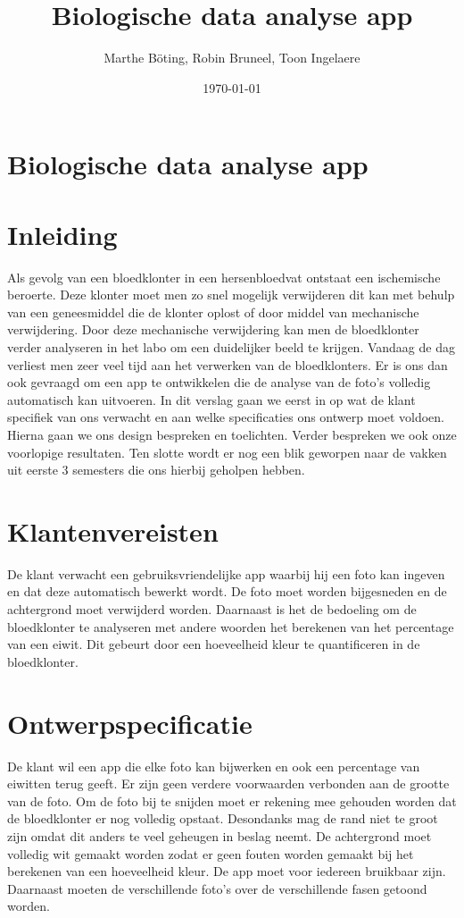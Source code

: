 \documentclass{kulakarticle}
\title{Biologische data analyse app}
\author{Marthe Böting, Robin Bruneel, Toon Ingelaere}
\date{\today}
\begin{document}
	\maketitle
	\section*{Biologische data analyse app}
	\section{Inleiding}
	Als gevolg van een bloedklonter in een hersenbloedvat ontstaat een ischemische beroerte. Deze klonter moet men zo snel mogelijk verwijderen dit kan met behulp van een geneesmiddel die de klonter oplost of door middel van mechanische verwijdering. Door deze mechanische verwijdering kan men de bloedklonter verder analyseren in het labo om een duidelijker beeld te krijgen.
	\newline
	Vandaag de dag verliest men zeer veel tijd aan het verwerken van de bloedklonters. Er is ons dan ook gevraagd om een app te ontwikkelen die de analyse van de foto’s volledig automatisch kan uitvoeren.
	\newline
	In dit verslag gaan we eerst in op wat de klant specifiek van ons verwacht en aan welke specificaties ons ontwerp moet voldoen. Hierna gaan we ons design bespreken en toelichten. Verder bespreken we ook onze voorlopige resultaten. Ten slotte wordt er nog een blik geworpen naar de vakken uit eerste 3 semesters die ons hierbij geholpen hebben.
	
	\section{Klantenvereisten}
	De klant verwacht een gebruiksvriendelijke app waarbij hij een foto kan ingeven en dat deze automatisch bewerkt wordt. De foto moet  worden bijgesneden en de achtergrond moet verwijderd worden. Daarnaast is het de bedoeling om de bloedklonter te analyseren met andere woorden het berekenen van het percentage van een eiwit. Dit gebeurt door een hoeveelheid kleur te quantificeren in de bloedklonter. 

	\section{Ontwerpspecificatie}
	De klant wil een app die elke foto kan bijwerken en ook een percentage van eiwitten terug geeft. Er zijn geen verdere voorwaarden verbonden aan de grootte van de foto. Om de foto bij te snijden moet er rekening mee gehouden worden dat de bloedklonter er nog volledig opstaat. Desondanks mag de rand niet te groot zijn omdat dit anders te veel geheugen in beslag neemt. De achtergrond moet volledig wit gemaakt worden zodat er geen fouten worden gemaakt bij het berekenen van een hoeveelheid kleur. De app moet voor iedereen bruikbaar zijn. Daarnaast moeten de verschillende foto's over de verschillende fasen getoond worden. 
\end{document}
